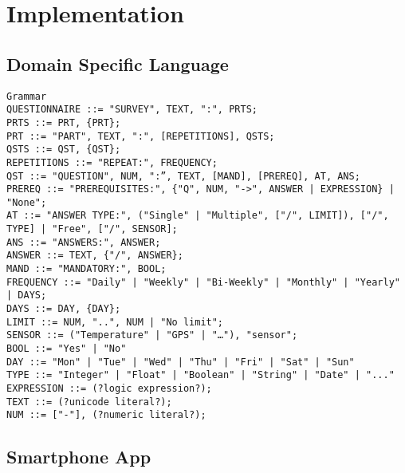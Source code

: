 \chapter{Implementation}
\label{chap:implementation}

\section{Domain Specific Language}
\label{sec:dsl}
\begin{verbatim}
Grammar
QUESTIONNAIRE ::= "SURVEY", TEXT, ":", PRTS;
PRTS ::= PRT, {PRT};
PRT ::= "PART", TEXT, ":", [REPETITIONS], QSTS;
QSTS ::= QST, {QST};
REPETITIONS ::= "REPEAT:", FREQUENCY;
QST ::= "QUESTION", NUM, ":”, TEXT, [MAND], [PREREQ], AT, ANS;    
PREREQ ::= "PREREQUISITES:", {"Q", NUM, "->", ANSWER | EXPRESSION} | "None";
AT ::= "ANSWER TYPE:", ("Single" | "Multiple", ["/", LIMIT]), ["/", TYPE] | "Free", ["/", SENSOR];
ANS ::= "ANSWERS:", ANSWER;
ANSWER ::= TEXT, {"/", ANSWER};
MAND ::= "MANDATORY:", BOOL;
FREQUENCY ::= "Daily" | "Weekly" | "Bi-Weekly" | "Monthly" | "Yearly" | DAYS;
DAYS ::= DAY, {DAY};
LIMIT ::= NUM, "..", NUM | "No limit";
SENSOR ::= ("Temperature" | "GPS" | "…"), "sensor";
BOOL ::= "Yes" | "No"
DAY ::= "Mon" | "Tue" | "Wed" | "Thu" | "Fri" | "Sat" | "Sun"
TYPE ::= "Integer" | "Float" | "Boolean" | "String" | "Date" | "..." 
EXPRESSION ::= (?logic expression?);
TEXT ::= (?unicode literal?);
NUM ::= ["-"], (?numeric literal?);
\end{verbatim}

\section{Smartphone App}
\label{sec:app}